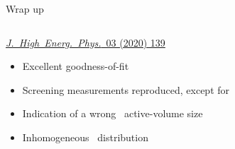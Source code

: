 \documentclass[10pt,aspectratio=169]{beamer}
\begin{document}
\begin{frame}{Wrap up}
  \begin{columns}
    \begin{column}{0.65\textwidth}
      \begin{simpleblock}\centering
        \href{https://doi.org/10.1007/JHEP03(2020)139}{\emph{J.~High~Energ.~Phys.}~03 (2020) 139}
      \end{simpleblock}
      \begin{itemize}
        \item Excellent goodness-of-fit
        \item Screening measurements reproduced, except for \kvn
        \item Indication of a wrong \bege\ active-volume size
        \item Inhomogeneous \kvz\ distribution
      \end{itemize}
    \end{column}
    \begin{column}{0.35\textwidth}
    \end{column}
  \end{columns}
\end{frame}
\end{document}
